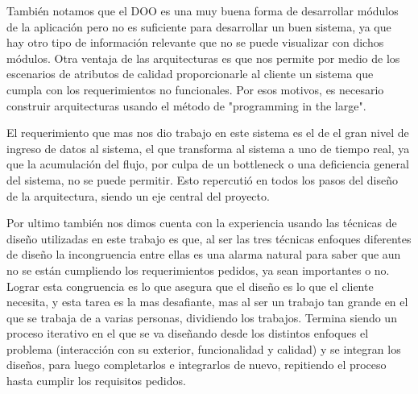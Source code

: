 \documentclass{article}
\theoremstyle{definition}
\theoremstyle{remark}
\begin{document}
También notamos que el DOO es una muy buena forma de desarrollar módulos de la aplicación pero no es suficiente para desarrollar un buen sistema, ya que hay otro tipo de información relevante que no se puede visualizar con dichos módulos. Otra ventaja de las arquitecturas es que nos permite por medio de los escenarios de atributos de calidad proporcionarle al cliente un sistema que cumpla con los requerimientos no funcionales. Por esos motivos, es necesario construir arquitecturas usando el método de "programming in the large".

El requerimiento que mas nos dio trabajo en este sistema es el de el gran nivel de ingreso de datos al sistema, el que transforma al sistema a uno de tiempo real, ya que la acumulación del flujo, por culpa de un bottleneck o una deficiencia general del sistema, no se puede permitir. Esto repercutió en todos los pasos del diseño de la arquitectura, siendo un eje central del proyecto.

Por ultimo también nos dimos cuenta con la experiencia usando las técnicas de diseño utilizadas en este trabajo es que, al ser las tres técnicas enfoques diferentes de diseño la incongruencia entre ellas es una alarma natural para saber que aun no se están cumpliendo los requerimientos pedidos, ya sean importantes o no. Lograr esta congruencia es lo que asegura que el diseño es lo que el cliente necesita, y esta tarea es la mas desafiante, mas al ser un trabajo tan grande en el que se trabaja de a varias personas, dividiendo los trabajos. Termina siendo un proceso iterativo en el que se va diseñando desde los distintos enfoques el problema (interacción con su exterior, funcionalidad y calidad) y se integran los diseños, para luego completarlos e integrarlos de nuevo, repitiendo el proceso hasta cumplir los requisitos pedidos.
\end{document}
